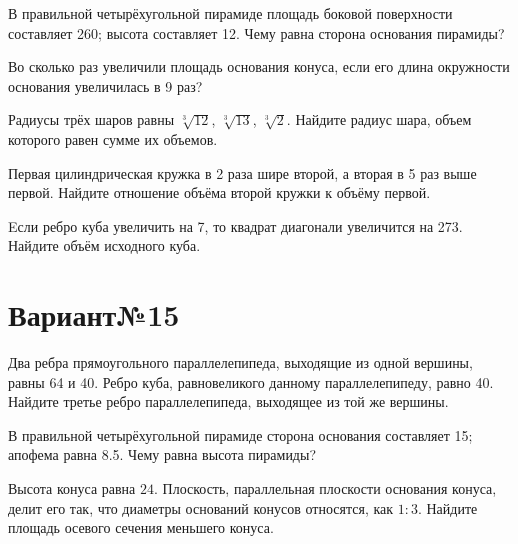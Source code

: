 \documentclass[4apaper]{article}
\begin{document}
\begin{taskBN}{2}
В правильной четырёхугольной пирамиде площадь боковой поверхности составляет 260; высота составляет 12. Чему равна сторона основания пирамиды?
\end{taskBN}

\begin{taskBN}{3}
Во сколько раз увеличили площадь основания конуса, если его длина окружности основания увеличилась в 9 раз?
\end{taskBN}

\begin{taskBN}{4}
Радиусы трёх шаров равны $\sqrt[3]{12}$, $\sqrt[3]{13}$, $\sqrt[3]{2}$. Найдите радиус шара, объем которого равен сумме их объемов.
\end{taskBN}

\begin{taskBN}{5}
 Первая цилиндрическая кружка в 2 раза шире второй, а вторая в 5 раз выше первой. Найдите отношение объёма второй кружки к объёму первой.
\end{taskBN}

\begin{taskBN}{6}
Eсли ребро куба увеличить на 7, то квадрат диагонали увеличится на 273. Найдите объём исходного куба.
\end{taskBN}
\newpage\section*{Вариант№15}

\begin{taskBN}{1}
Два ребра прямоугольного параллелепипеда, выходящие из одной вершины, равны 64 и 40. Ребро куба, равновеликого данному параллелепипеду, равно 40. Найдите третье ребро параллелепипеда, выходящее из той же вершины.
\end{taskBN}

\begin{taskBN}{2}
В правильной четырёхугольной пирамиде сторона основания составляет 15; апофема равна 8.5. Чему равна высота пирамиды?
\end{taskBN}

\begin{taskBN}{3}
Высота конуса равна $24$. Плоскость, параллельная плоскости основания конуса,  делит его так, что диаметры оснований конусов относятся, как $1:3$. Найдите площадь осевого сечения меньшего конуса. 
\end{taskBN}
\end{document}
